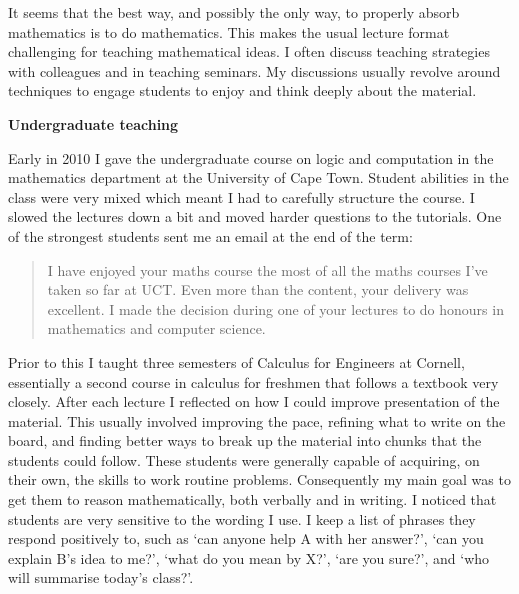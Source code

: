 \documentclass{article}[12pt]
\theoremstyle{plain} \numberwithin{equation}{section}
\theoremstyle{definition}
\begin{document}
\thispagestyle{fancy}

It seems that the best way, and possibly the only way, to properly absorb mathematics is to do mathematics. 
This makes the usual lecture format challenging for teaching mathematical ideas. I often discuss teaching strategies with colleagues and in teaching seminars.
My discussions usually revolve around techniques to engage students to enjoy and think deeply about the material.

{\bf Undergraduate teaching}


Early in 2010 I gave the undergraduate course on logic and computation in the mathematics department at the University of Cape Town. Student abilities in the class were very mixed which meant I had to carefully structure the course. I slowed the lectures down a bit and moved harder questions to the tutorials. One of the strongest students sent me an email at the end of the term:
\begin{quote}
I have enjoyed your maths course the most of all the maths courses I've taken so far at UCT. Even more than the content, your delivery was excellent.
I made the decision during one of your lectures to do honours in mathematics and computer science. 
\end{quote}

Prior to this I taught three semesters of Calculus for Engineers at Cornell, essentially a second course in calculus for freshmen that follows a textbook very closely.
After each lecture I reflected on how I could improve presentation of the material. This usually involved improving the pace, refining what to write on the board, and finding better ways to break up the material into chunks that the students could follow. These students were generally capable of acquiring, on their own, the skills to work routine problems.
Consequently my main goal  was to get them to reason mathematically, both verbally and in writing. 
I noticed that students are very sensitive to the wording I use.
I keep a list of phrases they respond positively to, such as  `can anyone help A with her answer?', `can you explain B's idea to me?', `what do you mean by X?',
`are you sure?',  and `who will summarise today's class?'.

\end{document}
